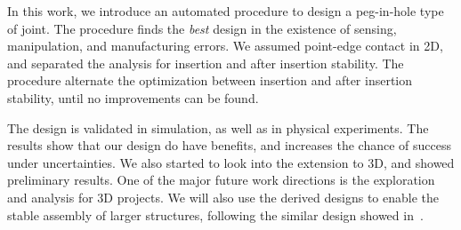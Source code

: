 \documentclass[letterpaper, 10 pt, conference]{ieeeconf}
\begin{document}
In this work, we introduce an automated procedure to design a peg-in-hole type of joint. The procedure finds the {\em best} design in the existence of sensing, manipulation, and manufacturing errors. We assumed point-edge contact in 2D, and separated the analysis for insertion and after insertion stability. The procedure alternate the optimization between insertion and after insertion stability, until no improvements can be found. 

The design is validated in simulation, as well as in physical experiments. The results show that our design do have benefits, and increases the chance of success under uncertainties. We also started to look into the extension to 3D, and showed preliminary results. One of the major future work directions is the exploration and analysis for 3D projects. We will also use the derived designs to enable the stable assembly of larger structures, following the similar design showed in~\cite{}. 

\renewcommand*{\bibfont}{\small}
\printbibliography
\end{document}
